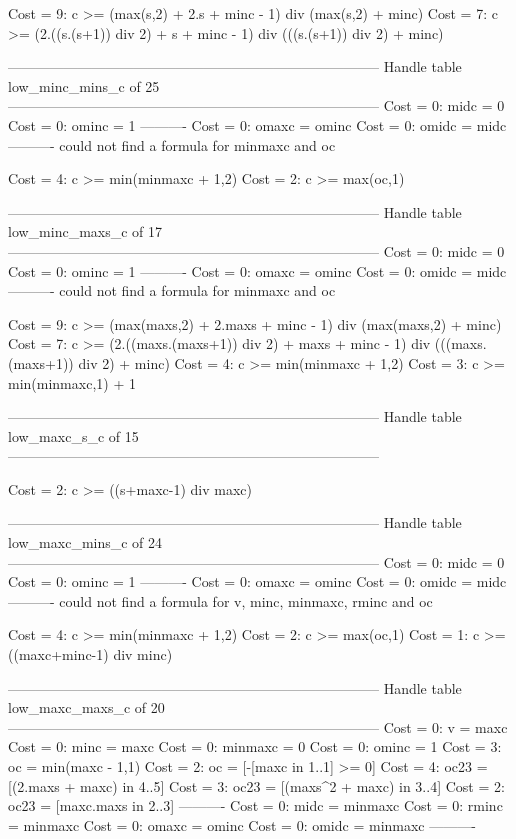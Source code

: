 Cost =  9:  c >= (max(s,2) + 2.s + minc - 1) div (max(s,2) + minc)
Cost =  7:  c >= (2.((s.(s+1)) div 2) + s + minc - 1) div (((s.(s+1)) div 2) + minc)

--------------------------------------------------------------------------------
Handle table low_minc_mins_c of 25
--------------------------------------------------------------------------------
Cost =  0:  midc    = 0
Cost =  0:  ominc   = 1
----------
Cost =  0:  omaxc   = ominc
Cost =  0:  omidc   = midc
----------
could not find a formula for minmaxc and oc

Cost =  4:  c >= min(minmaxc + 1,2)
Cost =  2:  c >= max(oc,1)

--------------------------------------------------------------------------------
Handle table low_minc_maxs_c of 17
--------------------------------------------------------------------------------
Cost =  0:  midc    = 0
Cost =  0:  ominc   = 1
----------
Cost =  0:  omaxc   = ominc
Cost =  0:  omidc   = midc
----------
could not find a formula for minmaxc and oc

Cost =  9:  c >= (max(maxs,2) + 2.maxs + minc - 1) div (max(maxs,2) + minc)
Cost =  7:  c >= (2.((maxs.(maxs+1)) div 2) + maxs + minc - 1) div (((maxs.(maxs+1)) div 2) + minc)
Cost =  4:  c >= min(minmaxc + 1,2)
Cost =  3:  c >= min(minmaxc,1) + 1

--------------------------------------------------------------------------------
Handle table low_maxc_s_c of 15
--------------------------------------------------------------------------------

Cost =  2:  c >= ((s+maxc-1) div maxc)

--------------------------------------------------------------------------------
Handle table low_maxc_mins_c of 24
--------------------------------------------------------------------------------
Cost =  0:  midc    = 0
Cost =  0:  ominc   = 1
----------
Cost =  0:  omaxc   = ominc
Cost =  0:  omidc   = midc
----------
could not find a formula for v, minc, minmaxc, rminc and oc

Cost =  4:  c >= min(minmaxc + 1,2)
Cost =  2:  c >= max(oc,1)
Cost =  1:  c >= ((maxc+minc-1) div minc)

--------------------------------------------------------------------------------
Handle table low_maxc_maxs_c of 20
--------------------------------------------------------------------------------
Cost =  0:  v       = maxc
Cost =  0:  minc    = maxc
Cost =  0:  minmaxc = 0
Cost =  0:  ominc   = 1
Cost =  3:  oc      = min(maxc - 1,1)
Cost =  2:  oc      = [-[maxc in 1..1] >= 0]
Cost =  4:  oc23    = [(2.maxs + maxc) in 4..5]
Cost =  3:  oc23    = [(maxs^2 + maxc) in 3..4]
Cost =  2:  oc23    = [maxc.maxs in 2..3]
----------
Cost =  0:  midc    = minmaxc
Cost =  0:  rminc   = minmaxc
Cost =  0:  omaxc   = ominc
Cost =  0:  omidc   = minmaxc
----------

